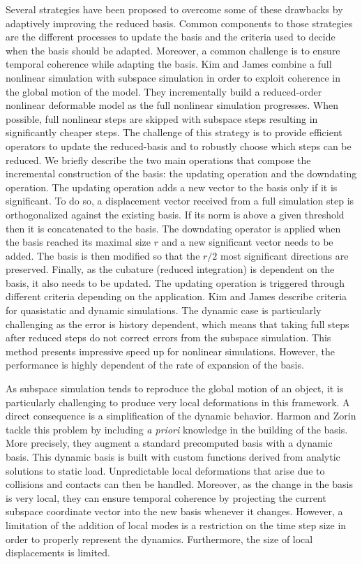 Several strategies have been proposed to overcome some of these drawbacks by adaptively improving the reduced basis. Common components to those strategies are the different processes to update the basis and the criteria used to decide when the basis should be adapted. Moreover, a common challenge is to ensure temporal coherence while adapting the basis.
Kim and James \cite{Kim2009Skipping} combine a full nonlinear simulation with subspace simulation in order to exploit coherence in the global motion of the model.
They incrementally build a reduced-order nonlinear deformable model as the full nonlinear simulation progresses. When possible, full nonlinear steps are skipped with subspace steps resulting in significantly cheaper steps. The challenge of this strategy is to provide efficient operators to update the reduced-basis and to robustly choose which steps can be reduced. We briefly describe the two main operations that compose the incremental construction of the basis: the updating operation and the downdating operation. The updating operation adds a new vector to the basis only if it is significant. To do so, a displacement vector received from a full simulation step is orthogonalized against the existing basis. If its norm is above a given threshold then it is concatenated to the basis. The downdating operator is applied when the basis reached its maximal size $r$ and a new significant vector needs to be added. The basis is then modified so that the $r/2$ most significant directions are preserved. Finally, as the cubature (reduced integration) is dependent on the basis, it also needs to be updated. The updating operation is triggered through different criteria depending on the application. Kim and James describe criteria for quasistatic and dynamic simulations. The dynamic case is particularly challenging as the error is history dependent, which means that taking full steps after reduced steps do not correct errors from the subspace simulation. This method presents impressive speed up for nonlinear simulations. However, the performance is highly dependent of the rate of expansion of the basis.

As subspace simulation tends to reproduce the global motion of an object, it is particularly challenging to produce very local deformations in this framework. A direct consequence is a simplification of the dynamic behavior. Harmon and Zorin \cite{Harmon2013} tackle this problem by including \textit{a priori} knowledge in the building of the basis. More precisely, they augment a standard precomputed basis with a dynamic basis. This dynamic basis is built with custom functions derived from analytic solutions to static load. Unpredictable local deformations that arise due to collisions and contacts can then be handled. Moreover, as the change in the basis is very local, they can ensure temporal coherence by projecting the current subspace coordinate vector into the new basis whenever it changes. However, a limitation of the addition of local modes is a restriction on the time step size in order to properly represent the dynamics. Furthermore, the size of local displacements is limited.

